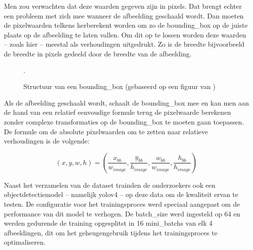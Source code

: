 Men zou verwachten dat deze waarden gegeven zijn in pixels. Dat brengt echter een probleem met zich mee wanneer de afbeelding geschaald wordt. Dan moeten de pixelwaarden telkens herberekent worden om zo de \gls{bounding_box} op de juiste plaats op de afbeelding te laten vallen. Om dit op te lossen worden deze waarden -- zoals hier -- meestal als verhoudingen uitgedrukt. Zo is de breedte bijvoorbeeld de breedte in pixels gedeeld door de breedte van de afbeelding.

\begin{figure}[H]
    \centering
    \caption[Structuur van een bounding box.]{\label{fig:bounding_box}Structuur van een \gls{bounding_box} (gebaseerd op een figuur van \textcite{Pessanha_Santos_2024})}.
\end{figure}

Als de afbeelding geschaald wordt, schaalt de \gls{bounding_box} mee en kan men aan de hand van een relatief eenvoudige formule terug de pixelwaarde berekenen zonder complexe transformaties op de \gls{bounding_box} te moeten gaan toepassen. De formule om de absolute pixelwaarden om te zetten naar relatieve verhoudingen is de volgende:

$$
(x,y,w,h) = \left(\frac{x_{bb}}{w_{image}},\frac{y_{bb}}{h_{image}},\frac{w_{bb}}{w_{image}},\frac{h_{bb}}{h_{image}}\right)
$$ 

\clearpage

Naast het verzamelen van de dataset trainden de onderzoekers ook een objectdetectiemodel -- namelijk \gls{yolo}v4 -- op deze data om de kwaliteit ervan te testen. De configuratie voor het trainingsproces werd speciaal aangepast om de performance van dit model te verhogen. De \gls{batch_size} werd ingesteld op 64 en werden gedurende de training opgesplitst in 16 \glspl{mini_batch} van elk 4 afbeeldingen, dit om het geheugengebruik tijdens het trainingsproces te optimaliseren. \\

